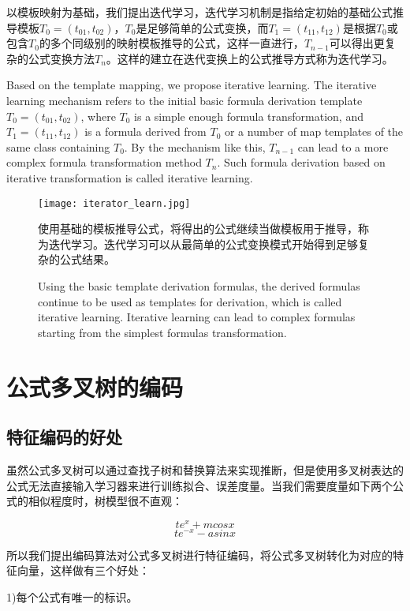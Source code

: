 \documentclass[runningheads]{llncs}
\begin{document}
以模板映射为基础，我们提出迭代学习，迭代学习机制是指给定初始的基础公式推导模板$T_0=(t_01,t_02)$，$T_0$是足够简单的公式变换，而$T_1=(t_11,t_12)$是根据$T_0$或包含$T_0$的多个同级别的映射模板推导的公式，这样一直进行，$T_{n-1}$可以得出更复杂的公式变换方法$T_{n}$。这样的建立在迭代变换上的公式推导方式称为迭代学习。

Based on the template mapping, we propose iterative learning. The iterative learning mechanism refers to the initial basic formula derivation template $T_0=(t_01,t_02)$, where $T_0$ is a simple enough formula transformation, and $T_1=(t_11 ,t_12)$ is a formula derived from $T_0$ or a number of map templates of the same class containing $T_0$. By the mechanism like this, $T_{n-1}$ can lead to a more complex formula transformation method $T_{n}$. Such formula derivation based on iterative transformation is called iterative learning.

\begin{figure}[H]
\centering
\texttt{[image: iterator\_learn.jpg]}
\caption{使用基础的模板推导公式，将得出的公式继续当做模板用于推导，称为迭代学习。迭代学习可以从最简单的公式变换模式开始得到足够复杂的公式结果。}
\caption{Using the basic template derivation formulas, the derived formulas continue to be used as templates for derivation, which is called iterative learning. Iterative learning can lead to complex formulas starting from the simplest formulas transformation.}
\end{figure}





\section{公式多叉树的编码}

\subsection{特征编码的好处}
虽然公式多叉树可以通过查找子树和替换算法来实现推断，但是使用多叉树表达的公式无法直接输入学习器来进行训练拟合、误差度量。当我们需要度量如下两个公式的相似程度时，树模型很不直观：

$$te^x+mcosx$$
$$te^{-x}-asinx$$

所以我们提出编码算法对公式多叉树进行特征编码，将公式多叉树转化为对应的特征向量，这样做有三个好处：

1)每个公式有唯一的标识。
\end{document}
